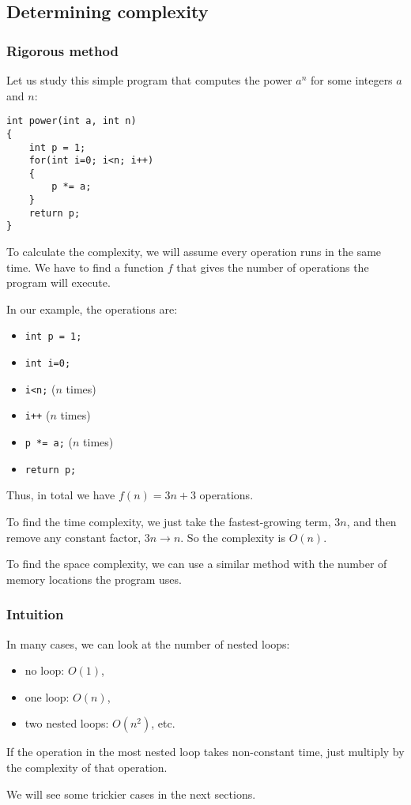 \subsection{Determining complexity}

\subsubsection{Rigorous method}

Let us study this simple program that computes the power $a^n$
for some integers $a$ and $n$:

\begin{verbatim}
int power(int a, int n)
{
    int p = 1;
    for(int i=0; i<n; i++)
    {
        p *= a;
    }
    return p;
}
\end{verbatim}

To calculate the complexity,
we will assume every operation runs in the same time.
We have to find a function $f$ that gives the number of operations
the program will execute.

In our example, the operations are:
\begin{itemize}
    \item \texttt{int p = 1;}
    \item \texttt{int i=0;}
    \item \texttt{i<n;} ($n$ times)
    \item \texttt{i++} ($n$ times)
    \item \texttt{p *= a;} ($n$ times)
    \item \texttt{return p;}
\end{itemize}
Thus, in total we have $f(n) = 3n+3$ operations.

To find the time complexity, we just take the fastest-growing term,
$3n$, and then remove any constant factor, $3n \rightarrow n$.
So the complexity is $O(n)$.

To find the space complexity, we can use a similar method
with the number of memory locations the program uses.


\subsubsection{Intuition}

In many cases, we can look at the number of nested loops:
\begin{itemize}
    \item no loop: $O(1)$,
    \item one loop: $O(n)$,
    \item two nested loops: $O(n^2)$, etc.
\end{itemize}
If the operation in the most nested loop takes non-constant time,
just multiply by the complexity of that operation.

We will see some trickier cases in the next sections.


